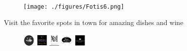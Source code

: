 \begin{multimuons-2}[enhanced, tikz={rotate=0}]{}
\begin{multicols*}{3}
    
    \begin{figure}
      \begin{center}
        \leavevmode
        \texttt{[image: ./figures/Fotis6.png]}
      \end{center}
    \end{figure}
    Visit the favorite spots in town for amazing dishes and wine
    \begin{figure}
      \begin{center}
        \leavevmode
        \includegraphics[width=0.3\textwidth]{./figures/restaurants.png}
      \end{center}
    \end{figure}
  \end{multicols*}
\end{multimuons-2}
